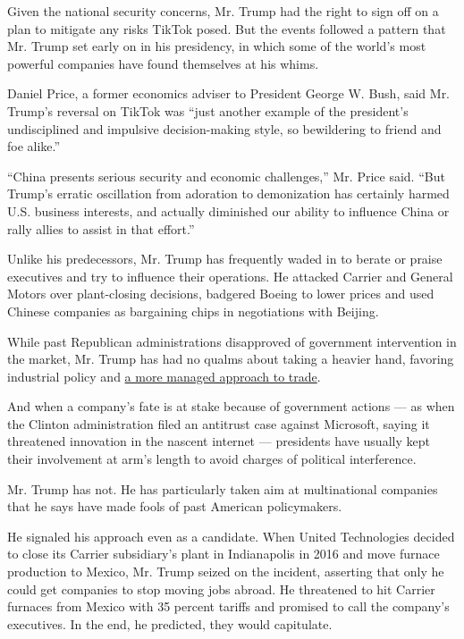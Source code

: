 Given the national security concerns, Mr. Trump had the right to sign
off on a plan to mitigate any risks TikTok posed. But the events
followed a pattern that Mr. Trump set early on in his presidency, in
which some of the world's most powerful companies have found themselves
at his whims.

Daniel Price, a former economics adviser to President George W. Bush,
said Mr. Trump's reversal on TikTok was ``just another example of the
president's undisciplined and impulsive decision-making style, so
bewildering to friend and foe alike.''

``China presents serious security and economic challenges,'' Mr. Price
said. ``But Trump's erratic oscillation from adoration to demonization
has certainly harmed U.S. business interests, and actually diminished
our ability to influence China or rally allies to assist in that
effort.''

Unlike his predecessors, Mr. Trump has frequently waded in to berate or
praise executives and try to influence their operations. He attacked
Carrier and General Motors over plant-closing decisions, badgered Boeing
to lower prices and used Chinese companies as bargaining chips in
negotiations with Beijing.

While past Republican administrations disapproved of government
intervention in the market, Mr. Trump has had no qualms about taking a
heavier hand, favoring industrial policy and
\href{https://www.nytimes3xbfgragh.onion/2019/12/17/business/trump-trade-deals-free-markets.html}{a
more managed approach to trade}.

And when a company's fate is at stake because of government actions ---
as when the Clinton administration filed an antitrust case against
Microsoft, saying it threatened innovation in the nascent internet ---
presidents have usually kept their involvement at arm's length to avoid
charges of political interference.

Mr. Trump has not. He has particularly taken aim at multinational
companies that he says have made fools of past American policymakers.

He signaled his approach even as a candidate. When United Technologies
decided to close its Carrier subsidiary's plant in Indianapolis in 2016
and move furnace production to Mexico, Mr. Trump seized on the incident,
asserting that only he could get companies to stop moving jobs abroad.
He threatened to hit Carrier furnaces from Mexico with 35 percent
tariffs and promised to call the company's executives. In the end, he
predicted, they would capitulate.

